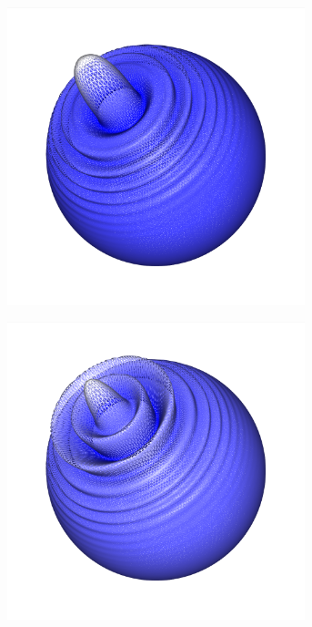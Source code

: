 \documentclass[crop=false]{standalone}
\begin{document}
\begin{figure}[h]
\begin{subfigure}[b]{0.24\textwidth}
        \includegraphics[trim={2.12cm 2.33cm 2.2cm 0cm},clip,width=0.95\textwidth]{images/sphere_wave_1.png}
        \caption{}
      \end{subfigure}
      \begin{subfigure}[b]{0.24\textwidth}
        \center
        \includegraphics[trim={2.12cm 2.33cm 2.2cm 0cm},clip,width=0.95\textwidth]{images/sphere_wave_2.png}

\end{subfigure}
\end{figure}
\end{document}

